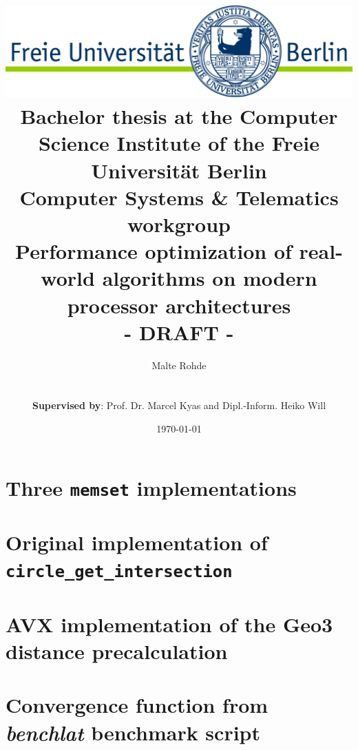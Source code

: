 \documentclass[a4paper,10pt]{article}
\title{\includegraphics[width=1.0\textwidth]{img/fulogo}\\[1.5cm]
{\normalsize Bachelor thesis at the Computer Science Institute of the Freie Universität Berlin\\ Computer Systems \& Telematics workgroup}\\[6ex] {\Huge Performance optimization of real-world algorithms on modern processor architectures\\[1cm]- DRAFT -}\\[6ex]}
\author{Malte Rohde\\
{\normalsize \mailto{malte.rohde@inf.fu-berlin.de}}\\\\
{\normalsize \textbf{Supervised by}: Prof. Dr. Marcel Kyas and Dipl.-Inform. Heiko Will}}
\date{\vspace*{1.0cm} \today{}}
\begin{document}
\begin{titlepage}

\maketitle
\thispagestyle{empty}

\vfill{}

\end{titlepage}

\pagestyle{empty}
\clearpage{}



\tableofcontents
\clearpage{}
\pagestyle{fancy}
\setcounter{page}{1}






\cleardoublepage
{}




\clearpage

\listoffigures
{}
\listoftables
\lstlistoflistings

\clearpage
\begin{appendices}
\section{Three \texttt{memset} implementations}
\label{memset_code}

\section{Original implementation of \texttt{circle\_get\_intersection}}
\label{scalarcircles}

\section{AVX implementation of the Geo3 distance precalculation}
\label{geodistancesavx}

\section{Convergence function from \emph{benchlat} benchmark script}
\label{convergence}

\end{appendices}
\end{document}
